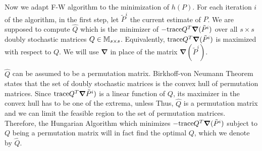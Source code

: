 \documentclass[12pt,oneside,final]{thesis}\usepackage[]{graphicx}\usepackage[]{color}
\begin{document}
Now we adapt F-W algorithm to the minimization of $h(P)$.  For each iteration $i$ of the algorithm, in the first step, let $\tilde{P}^{i}$ the current estimate of $P$. We are supposed to compute  $\hat{Q}$ which is the minimizer of  $-\textup{trace} Q^{T}\boldsymbol{\nabla}(\tilde{P}^{i})$ over all $s \times s$ doubly stochastic matrices $Q \in \mathbb{M} _{s \times s}$. Equivalently, $\textup{trace} Q^{T}\boldsymbol{\nabla}(\tilde{P}^{i})$ is maximized with respect to $Q$. We will use  $\boldsymbol{\nabla}$ in place of the matrix $\boldsymbol{\nabla}(\tilde{P}^{i})$.

 $\hat{Q}$ can be assumed to be a permutation matrix. Birkhoff-von Neumann Theorem\cite{MatrixTheory} states that the set of doubly stochastic matrices is the convex hull of permutation matrices. Since $\textup{trace}{Q^{T}\boldsymbol{\nabla}\tilde{P}^{i})}$  is a linear function of $Q$, its maximizer in the convex hull has to be one of the extrema, unless 
Thus, $\hat{Q}$  is a permutation matrix and we can limit the feasible region to the set of permutation matrices.
Therefore, the  Hungarian Algorithm which minimizes $-\textup{trace} Q^{T}\boldsymbol{\nabla}(\tilde{P}^{i})$ subject to $Q$ being a permutation matrix will in fact find the optimal $Q$, which we denote by $\hat{Q}$.
\end{document}
